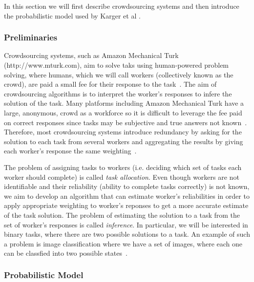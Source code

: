 \documentclass[12pt]{article}
\numberwithin{equation}{section}
\begin{document}
In this section we will first describe crowdsourcing systems and then introduce the probabilistic model used by Karger et al \cite{KOS13}.

\subsubsection{Preliminaries}
\label{sec:background;subsec:crowdsourcingSystems;subsubsec:preliminaries}

Crowdsourcing systems, such as Amazon Mechanical Turk (http://www.mturk.com), aim to solve taks using human-powered problem solving, where humans, which we will call workers (collectively known as the crowd), are paid a small fee for their response to the task~\cite{KOS13,EHR12}. The aim of crowdsourcing algorithms is to interpret the worker's responses to infere the solution of the task. Many platforms including Amazon Mechanical Turk have a large, anonymous, crowd as a workforce so it is difficult to leverage the fee paid on correct responses since tasks may be subjective and true answers not known~\cite{KOS13}. Therefore, most crowdsourcing systems introduce redundancy by asking for the solution to each task from several workers and aggregating the results by giving each worker's response the same weighting~\cite{KOS13}.

The problem of assigning tasks to workers (i.e. deciding which set of tasks each worker should complete) is called \textsl{task allocation}. Even though workers are not identifiable and their reliability (ability to complete tasks correctly) is not known, we aim to develop an algorithm that can estimate worker's reliabilities in order to apply appropriate weighting to worker's reponses to get a more accurate estimate of the task solution. The problem of estimating the solution to a task from the set of worker's responses is called \textsl{inference}. In particular, we will be interested in binary tasks, where there are two possible solutions to a task. An example of such a problem is image classification where we have a set of images, where each one can be classfied into two possible states~\cite{KOS13}.

\subsubsection{Probabilistic Model}
\label{sec:background;subsec:crowdsourcingSystems;subsubsec:probabilisticModel}
\end{document}
